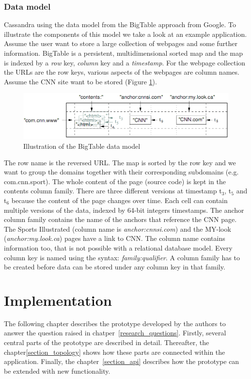 \documentclass[a4paper]{article}
\begin{document}
\subsubsection{Data model}
Cassandra using the data model from the BigTable \cite{chang2008bigtable} approach from Google. To illustrate the components of this model we take a look at an example application. Assume the user want to store a large collection of webpages and some further information. BigTable is a persistent, multidimensional sorted map and the map is indexed by a \textit{row} key, \textit{column} key and a \textit{timestamp}. For the webpage collection the URLs are the row keys, various aspects of the webpages are column names. Assume the CNN site want to be stored (Figure \ref{model_bigtable}).
\begin{figure}[h!]
	\centering
	\includegraphics[scale=0.4]{images/modelBigTable.png}
	\caption{Illustration of the BigTable data model}
	\label{model_bigtable}
\end{figure}
The row name is the reversed URL. The map is sorted by the row key and we want to group the domains together with their corresponding subdomains (e.g. com.cnn.sport). The whole content of the page (source code) is kept in the contents column family. There are three different versions at timestamp t$_{3}$, t$_{5}$ and t$_{6}$ because the content of the page changes over time. Each cell can contain multiple versions of the data, indexed by 64-bit integers timestamps. The anchor column family contains the name of the anchors that reference the CNN page. The Sports Illustrated (column name is \textit{anchor:cnnsi.com}) and the MY-look (\textit{anchor:my.look.ca}) pages have a link to CNN. The column name contains information too, that is not possible with a relational database model. Every column key is named using the syntax: \textit{family:qualifier}. A column family has to be created before data can be stored under any column key in that family.


\section{Implementation}
The following chapter describes the prototype developed by the authors to answer the question raised in chatper~\ref{research_questions}. Firstly, several central parts of the prototype are described in detail. Thereafter, the chapter\ref{section_topology} shows how these parts are connected within the application. Finally, the chapter~\ref{section_api} describes how the prototype can be extended with new functionality.
\end{document}
